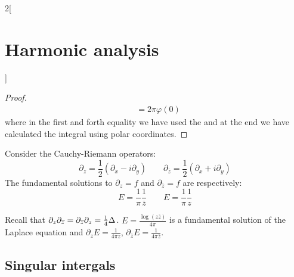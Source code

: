 \documentclass[../../../main_math.tex]{subfiles}
\begin{document}
\begin{multicols}{2}[\section{Harmonic analysis}]
\begin{proof}
\begin{align*}
                                                         & =2\pi\varphi(0)
    \end{align*}
    where in the first and forth equality we have used the  and at the end we have calculated the integral using polar coordinates.
  \end{proof}
  \begin{corollary}
    Consider the Cauchy-Riemann operators:
    $$
      \partial_z=\frac{1}{2}\left(\partial_x-i\partial_y\right)\qquad \partial_{\overline{z}}=\frac{1}{2}\left(\partial_x+i\partial_y\right)
    $$
    The fundamental solutions to $\partial_z=f$ and $\partial_{\overline{z}}=f$ are respectively:
    $$
      E=\frac{1}{\pi}\frac{1}{\overline{z}}\qquad E=\frac{1}{\pi}\frac{1}{z}
    $$
  \end{corollary}
  \begin{sproof}
    Recall that $\partial_z\partial_{\overline{z}}=\partial_{\overline{z}}\partial_z=\frac{1}{4}\Delta$. $E=\frac{\log(z\overline{z})}{4\pi}$ is a fundamental solution of the Laplace equation and $\partial_z E=\frac{1}{4\pi z}$, $\partial_{\overline{z}} E=\frac{1}{4\pi \overline{z}}$.
  \end{sproof}
  \subsection{Singular intergals}

\end{multicols}
\end{document}
